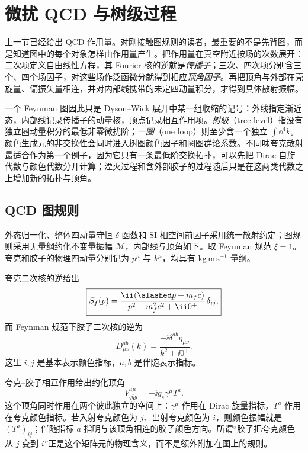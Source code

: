 \section{微扰 QCD 与树级过程}\label{sec:qcd-tree-processes-dp10}

上一节已经给出 QCD 作用量。对刚接触图规则的读者，最重要的不是先背图，而是知道图中的每个对象怎样由作用量产生。把作用量在真空附近按场的次数展开：二次项定义自由线性方程，其 Fourier 核的逆就是\emph{传播子}；三次、四次项分别含三个、四个场因子，对这些场作泛函微分就得到相应\emph{顶角因子}。再把顶角与外部在壳旋量、偏振矢量相连，并对内部线携带的未定四动量积分，才得到具体散射振幅。

一个 Feynman 图因此只是 Dyson--Wick 展开中某一组收缩的记号：外线指定渐近态，内部线记录传播子的动量核，顶点记录相互作用项。\emph{树级}（tree level）指没有独立圈动量积分的最低非零微扰阶；\emph{一圈}（one loop）则至少含一个独立 $\int\dd^4k$。颜色生成元的非交换性会同时进入树图颜色因子和圈图群论系数。不同味夸克散射最适合作为第一个例子，因为它只有一条最低阶交换拓扑，可以先把 Dirac 自旋代数与颜色代数分开计算；湮灭过程和含外部胶子的过程随后只是在这两类代数之上增加新的拓扑与顶角。

\subsection{QCD 图规则}

外态归一化、整体四动量守恒 $\delta$ 函数和 SI 相空间前因子采用统一散射约定；图规则采用无量纲约化不变量振幅 $\mathcal M$，内部线与顶角如下。取 Feynman 规范 $\xi=1$。夸克和胶子的物理四动量分别记为 $p^\mu$ 与 $k^\mu$，均具有 $\mathrm{kg\,m\,s^{-1}}$ 量纲。

夸克二次核的逆给出
\begin{equation}
 \boxed{
 S_f(p)
 =\frac{\ii(\slashed p+m_fc)}{p^2-m_f^2c^2+\ii0^+}\,\delta_{ij},}
 \label{eq:qcd-quark-propagator-dp10}
\end{equation}
而 Feynman 规范下胶子二次核的逆为
\begin{equation}
 \boxed{
 D_{\mu\nu}^{ab}(k)
 =\frac{-\ii\delta^{ab}\eta_{\mu\nu}}
 {k^2+\ii0^+}.}
 \label{eq:qcd-gluon-propagator-dp10}
\end{equation}
这里 $i,j$ 是基本表示颜色指标，$a,b$ 是伴随表示指标。

夸克--胶子相互作用给出约化顶角
\begin{equation}
 \boxed{
 V_{q\bar q g}^{a\mu}=-\ii g_s\gamma^\mu T^a.}
 \label{eq:qcd-quark-gluon-vertex-dp10}
\end{equation}
这个顶角同时作用在两个彼此独立的空间上：$\gamma^\mu$ 作用在 Dirac 旋量指标，$T^a$ 作用在夸克颜色指标。若入射夸克颜色为 $j$、出射夸克颜色为 $i$，则颜色振幅就是 $(T^a)_{ij}$；伴随指标 $a$ 指明与该顶角相连的胶子颜色方向。所谓“胶子把夸克颜色从 $j$ 变到 $i$”正是这个矩阵元的物理含义，而不是额外附加在图上的规则。


